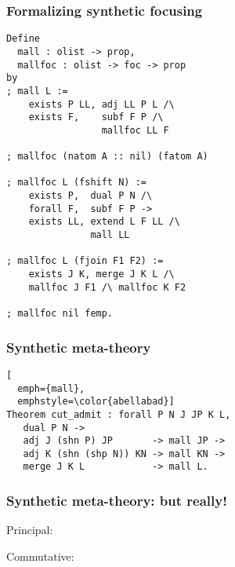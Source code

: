 \documentclass{beamer}
\begin{document}
\begin{frame}[fragile]
  \frametitle{Formalizing synthetic focusing}

  \smaller

\begin{lstlisting}
Define
  mall : olist -> prop,
  mallfoc : olist -> foc -> prop
by
; mall L :=
    exists P LL, adj LL P L /\
    exists F,    subf F P /\
                 mallfoc LL F

; mallfoc (natom A :: nil) (fatom A)

; mallfoc L (fshift N) :=
    exists P,  dual P N /\
    forall F,  subf F P ->
    exists LL, extend L F LL /\
               mall LL

; mallfoc L (fjoin F1 F2) :=
    exists J K, merge J K L /\
    mallfoc J F1 /\ mallfoc K F2

; mallfoc nil femp.
\end{lstlisting}
\end{frame}

\begin{frame}[fragile]
  \frametitle{Synthetic meta-theory}

  \judg{
    \infer={
      \ts \G, \D
    }{
      \ts \G, \SHN P
      &
      \ts \D, \SHN \SHP \dual P
    }
  }

\begin{lstlisting}[
  emph={mall},
  emphstyle=\color{abellabad}]
Theorem cut_admit : forall P N J JP K L,
   dual P N ->
   adj J (shn P) JP       -> mall JP ->
   adj K (shn (shp N)) KN -> mall KN ->
   merge J K L            -> mall L.
\end{lstlisting}
\end{frame}

\begin{frame}
  \frametitle{Synthetic meta-theory: but really!}

  Principal:
  \judg{
    \infer={
      \ts \G, \D
    }{
      (\W \in P)
      &
      \ts \G : \foc{\W}
      &
      \ts \D : \foc{\SHP \dual P}
    }
  }

  Commutative:
  \judg{
    \infer={
      \ts \G, \D : [\W]
    }{
      \ts \G, \SHN P : [\W]
      &
      \ts \D : \foc{\SHP \dual P}
    }
  }
\end{frame}
\end{document}

